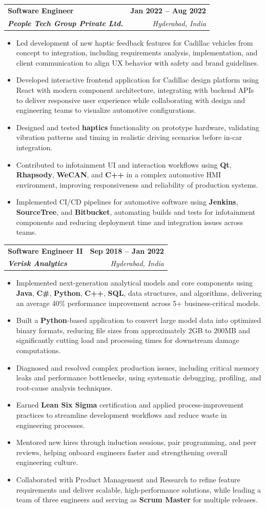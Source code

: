 \documentclass[letterpaper,11pt]{article}
\makeatletter
\newcommand{\resumeItem}[1]{
  \item\small{
    {#1 \vspace{-2pt}}
  }
}
\newcommand{\resumeSubheading}[4]{
  \vspace{-2pt}\item
    \begin{tabular*}{1.0\textwidth}[t]{l@{\extracolsep{\fill}}r}
      \textbf{#1} & \textbf{\small #2} \\
      \textit{\small#3} & \textit{\small #4} \\
    \end{tabular*}\vspace{-7pt}
}
\newcommand{\resumeItemListStart}{\begin{itemize}}
\newcommand{\resumeItemListEnd}{\end{itemize}\vspace{-5pt}}
\makeatother
\begin{document}
    \resumeSubheading
      {\textbf{Software Engineer}}{\textbf{Jan 2022 -- Aug 2022}}
      {\textbf{People Tech Group Private Ltd.}}{Hyderabad, India}
      \resumeItemListStart
        \resumeItem{Led development of new haptic feedback features for Cadillac vehicles from concept to integration, including requirements analysis, implementation, and client communication to align UX behavior with safety and brand guidelines.}
        \resumeItem{Developed interactive frontend application for Cadillac design platform using React with modern component architecture, integrating with backend APIs to deliver responsive user experience while collaborating with design and engineering teams to visualize automotive configurations.}
        \resumeItem{Designed and tested \textbf{haptics} functionality on prototype hardware, validating vibration patterns and timing in realistic driving scenarios before in-car integration.}
        \resumeItem{Contributed to infotainment UI and interaction workflows using \textbf{Qt}, \textbf{Rhapsody}, \textbf{WeCAN}, and \textbf{C++} in a complex automotive HMI environment, improving responsiveness and reliability of production systems.}
        \resumeItem{Implemented CI/CD pipelines for automotive software using \textbf{Jenkins}, \textbf{SourceTree}, and \textbf{Bitbucket}, automating builds and tests for infotainment components and reducing deployment time and integration issues across teams.}
      \resumeItemListEnd

    \resumeSubheading
      {\textbf{Software Engineer II}}{\textbf{Sep 2018 -- Jan 2022}}
      {\textbf{Verisk Analytics}}{Hyderabad, India}
      \resumeItemListStart
        \resumeItem{Implemented next-generation analytical models and core components using \textbf{Java}, \textbf{C\#}, \textbf{Python}, \textbf{C++}, \textbf{SQL}, data structures, and algorithms, delivering an average 40\% performance improvement across 5+ business-critical models.}
        \resumeItem{Built a \textbf{Python}-based application to convert large model data into optimized binary formats, reducing file sizes from approximately 2GB to 200MB and significantly cutting load and processing times for downstream damage computations.}
        \resumeItem{Diagnosed and resolved complex production issues, including critical memory leaks and performance bottlenecks, using systematic debugging, profiling, and root-cause analysis techniques.}
        \resumeItem{Earned \textbf{Lean Six Sigma} certification and applied process-improvement practices to streamline development workflows and reduce waste in engineering processes.}
        \resumeItem{Mentored new hires through induction sessions, pair programming, and peer reviews, helping onboard engineers faster and strengthening overall engineering culture.}
        \resumeItem{Collaborated with Product Management and Research to refine feature requirements and deliver scalable, high-performance solutions, while leading a team of three engineers and serving as \textbf{Scrum Master} for multiple releases.}
      \resumeItemListEnd
\end{document}
